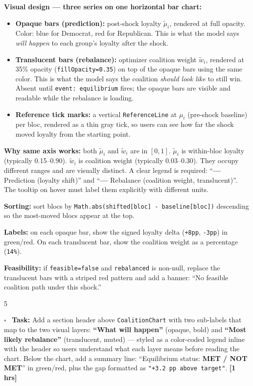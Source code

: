 \documentclass[11pt]{article}
\newcommand{\hrs}[1]{\textbf{[#1 hrs]}}
\newcommand{\task}[2]{%
  \noindent\textbf{Task:} #1 \hfill \hrs{#2}\\}
\newcommand{\done}{\textcolor{sectionblue}{$\square$}\ }
\begin{document}
\begin{taskbox}
{  \textbf{Visual design --- three series on one horizontal bar chart:}
  \begin{itemize}[leftmargin=1.6em, itemsep=2pt]
    \item \textbf{Opaque bars (prediction):} post-shock loyalty
          $\tilde{\mu}_i$, rendered at full opacity. Color: blue for Democrat,
          red for Republican. This is what the model says \emph{will happen}
          to each group's loyalty after the shock.
    \item \textbf{Translucent bars (rebalance):} optimizer coalition weight
          $\tilde{w}_i$, rendered at 35\% opacity (\texttt{fillOpacity=0.35})
          on top of the opaque bars using the same color. This is what the
          model says the coalition \emph{should look like} to still win.
          Absent until \texttt{event: equilibrium} fires; the opaque bars are
          visible and readable while the rebalance is loading.
    \item \textbf{Reference tick marks:} a vertical \texttt{ReferenceLine} at
          $\mu_i$ (pre-shock baseline) per bloc, rendered as a thin gray
          tick, so users can see how far the shock moved loyalty from the
          starting point.
  \end{itemize}

  \textbf{Why same axis works:} both $\tilde{\mu}_i$ and $\tilde{w}_i$ are
  in $[0, 1]$. $\tilde{\mu}_i$ is within-bloc loyalty (typically 0.15--0.90).
  $\tilde{w}_i$ is coalition weight (typically 0.03--0.30). They occupy
  different ranges and are visually distinct. A clear legend is required:
  ``\textbf{---} Prediction (loyalty shift)'' and
  ``\textbf{---} Rebalance (coalition weight, translucent)''. The tooltip
  on hover must label them explicitly with different units.

  \textbf{Sorting:} sort blocs by \texttt{Math.abs(shifted[bloc] -
  baseline[bloc])} descending so the most-moved blocs appear at the top.

  \textbf{Labels:} on each opaque bar, show the signed loyalty delta
  (\texttt{+8pp}, \texttt{-3pp}) in green/red. On each translucent bar,
  show the coalition weight as a percentage (\texttt{14\%}).

  \textbf{Feasibility:} if \texttt{feasible=false} and \texttt{rebalanced}
  is non-null, replace the translucent bars with a striped red pattern and
  add a banner: ``No feasible coalition path under this shock.''}{5}

\done \task{Add a section header above \texttt{CoalitionChart} with two
  sub-labels that map to the two visual layers:
  \textbf{``What will happen''} (opaque, bold) and
  \textbf{``Most likely rebalance''} (translucent, muted) --- styled as a
  color-coded legend inline with the header so users understand what each
  layer means before reading the chart. Below the chart, add a summary
  line: ``Equilibrium status: \textbf{MET / NOT MET}'' in green/red, plus
  the gap formatted as \texttt{"+3.2 pp above target"}.}{1}
\end{taskbox}
\end{document}
